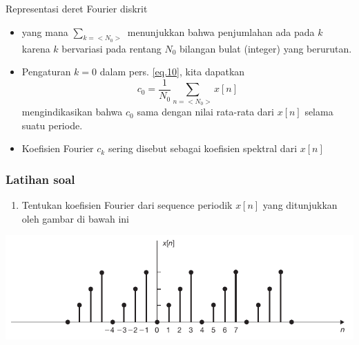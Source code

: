 \documentclass[pdflatex,compress,mathserif]{beamer}
\begin{document}
\begin{frame}{Representasi deret Fourier diskrit}
	\begin{itemize}
		\item[] yang mana $ \sum_{k = <N_0>} $ menunjukkan bahwa penjumlahan ada pada $ k $ karena $ k $ bervariasi pada rentang $ N_0 $ bilangan bulat (integer) yang berurutan.
		\item Pengaturan $ k = 0 $ dalam pers. \ref{eq.10}, kita dapatkan
		\begin{equation}\label{eq.11}
			c_0 = \frac{1}{N_0} \sum_{n = <N_0>} x[n]
		\end{equation}
		mengindikasikan bahwa $ c_0 $ sama dengan nilai rata-rata dari $ x[n] $ selama suatu periode.
		\item Koefisien Fourier $ c_k $ sering disebut sebagai koefisien spektral dari $ x[n] $
	\end{itemize}
\end{frame}

\begin{frame}
	\frametitle{Latihan soal}
	\begin{enumerate}
		\item Tentukan koefisien Fourier dari sequence periodik $ x[n] $ yang ditunjukkan oleh gambar di bawah ini
	\end{enumerate}
	\begin{center}
		\includegraphics[width=\linewidth]{img/img01}
	\end{center}
	
\end{frame}
\end{document}

